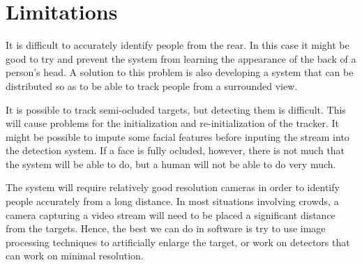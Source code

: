 \section{Limitations}
  It is difficult to accurately identify people from the rear.
  In this case it might be good to try and prevent the system from learning the appearance of the back of a person's head.
  A solution to this problem is also developing a system that can be distributed so as to be able to track people from a surrounded view.

  It is possible to track semi-ocluded targets, but detecting them is difficult.
  This will cause problems for the initialization and re-initialization of the tracker.
  It might be possible to impute some facial features before inputing the stream into the detection system.
  If a face is fully ocluded, however, there is not much that the system will be able to do, but a human will not be able to do very much.

  The system will require relatively good resolution cameras in order to identify people accurately from a long distance.
  In most situations involving crowds, a camera capturing a video stream will need to be placed a significant distance from the targets.
  Hence, the best we can do in software is try to use image processing techniques to artificially enlarge the target, or work on detectors that can work on minimal resolution.
